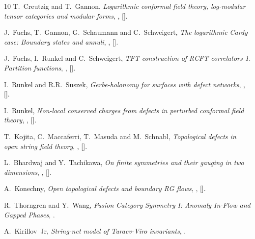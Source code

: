\begin{thebibliography}{10}
T.~Creutzig and T.~Gannon,
\textit{Logarithmic conformal field theory, log-modular tensor categories and modular forms},
,
[].

J.~Fuchs, T.~Gannon, G.~Schaumann and C.~Schweigert,
\textit{The logarithmic Cardy case: Boundary states and annuli},
,
[].

J.~Fuchs, I.~Runkel and C.~Schweigert,
\textit{TFT construction of RCFT correlators 1. Partition functions},
,
[].

I.~Runkel and R.R.~Suszek,
\textit{Gerbe-holonomy for surfaces with defect networks},
,
[].

I.~Runkel,
\textit{Non-local conserved charges from defects in perturbed conformal field theory},
,
[].

T.~Kojita, C.~Maccaferri, T.~Masuda and M.~Schnabl,
\textit{Topological defects in open string field theory},
,
[].

L.~Bhardwaj and Y.~Tachikawa,
\textit{On finite symmetries and their gauging in two dimensions},
,
[].

A.~Konechny,
\textit{Open topological defects and boundary RG flows},
,
[].

R.~Thorngren and Y.~Wang,
\textit{Fusion Category Symmetry I: Anomaly In-Flow and Gapped Phases},
.

A.~Kirillov~Jr,
\textit{String-net model of Turaev-Viro invariants},
.


\end{thebibliography}
